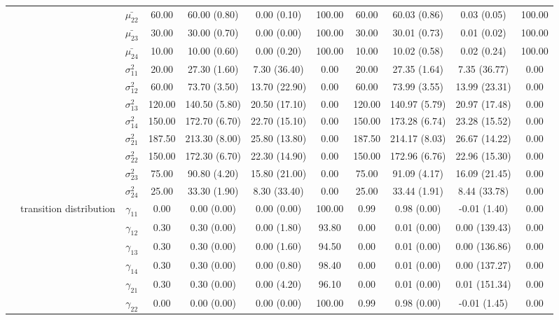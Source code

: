 \begin{table}[h]
{\begin{tabular}{ccccccccccc}
 &  & $\bar{\mu_{22}}$ & 60.00 & 60.00 (0.80) & 0.00 (0.10) & 100.00 & 60.00 & 60.03 (0.86) & 0.03 (0.05) & 100.00 \\
 &  & $\bar{\mu_{23}}$ & 30.00 & 30.00 (0.70) & 0.00 (0.00) & 100.00 & 30.00 & 30.01 (0.73) & 0.01 (0.02) & 100.00 \\
 &  & $\bar{\mu_{24}}$ & 10.00 & 10.00 (0.60) & 0.00 (0.20) & 100.00 & 10.00 & 10.02 (0.58) & 0.02 (0.24) & 100.00 \\
 &  & $\sigma^2_{11}$ & 20.00 & 27.30 (1.60) & 7.30 (36.40) & 0.00 & 20.00 & 27.35 (1.64) & 7.35 (36.77) & 0.00 \\
 &  & $\sigma^2_{12}$ & 60.00 & 73.70 (3.50) & 13.70 (22.90) & 0.00 & 60.00 & 73.99 (3.55) & 13.99 (23.31) & 0.00 \\
 &  & $\sigma^2_{13}$ & 120.00 & 140.50 (5.80) & 20.50 (17.10) & 0.00 & 120.00 & 140.97 (5.79) & 20.97 (17.48) & 0.00 \\
 &  & $\sigma^2_{14}$ & 150.00 & 172.70 (6.70) & 22.70 (15.10) & 0.00 & 150.00 & 173.28 (6.74) & 23.28 (15.52) & 0.00 \\
 &  & $\sigma^2_{21}$ & 187.50 & 213.30 (8.00) & 25.80 (13.80) & 0.00 & 187.50 & 214.17 (8.03) & 26.67 (14.22) & 0.00 \\
 &  & $\sigma^2_{22}$ & 150.00 & 172.30 (6.70) & 22.30 (14.90) & 0.00 & 150.00 & 172.96 (6.76) & 22.96 (15.30) & 0.00 \\
 &  & $\sigma^2_{23}$ & 75.00 & 90.80 (4.20) & 15.80 (21.00) & 0.00 & 75.00 & 91.09 (4.17) & 16.09 (21.45) & 0.00 \\
 &  & $\sigma^2_{24}$ & 25.00 & 33.30 (1.90) & 8.30 (33.40) & 0.00 & 25.00 & 33.44 (1.91) & 8.44 (33.78) & 0.00 \\
 & \multirow{16}{*}{transition distribution} & $\gamma_{11}$ & 0.00 & 0.00 (0.00) & 0.00 (0.00) & 100.00 & 0.99 & 0.98 (0.00) & -0.01 (1.40) & 0.00 \\
 &  & $\gamma_{12}$ & 0.30 & 0.30 (0.00) & 0.00 (1.80) & 93.80 & 0.00 & 0.01 (0.00) & 0.00 (139.43) & 0.00 \\
 &  & $\gamma_{13}$ & 0.30 & 0.30 (0.00) & 0.00 (1.60) & 94.50 & 0.00 & 0.01 (0.00) & 0.00 (136.86) & 0.00 \\
 &  & $\gamma_{14}$ & 0.30 & 0.30 (0.00) & 0.00 (0.80) & 98.40 & 0.00 & 0.01 (0.00) & 0.00 (137.27) & 0.00 \\
 &  & $\gamma_{21}$ & 0.30 & 0.30 (0.00) & 0.00 (4.20) & 96.10 & 0.00 & 0.01 (0.00) & 0.01 (151.34) & 0.00 \\
 &  & $\gamma_{22}$ & 0.00 & 0.00 (0.00) & 0.00 (0.00) & 100.00 & 0.99 & 0.98 (0.00) & -0.01 (1.45) & 0.00 \\

\end{tabular}}
\end{table}
